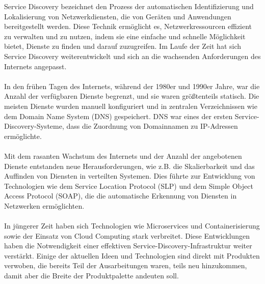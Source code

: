 \documentclass[../vs-script-first-v01.tex]{subfiles}
\begin{document}
Service Discovery bezeichnet den Prozess der automatischen Identifizierung und Lokalisierung von Netzwerkdiensten, die von Geräten und Anwendungen bereitgestellt werden. Diese Technik ermöglicht es, Netzwerkressourcen effizient zu verwalten und zu nutzen, indem sie eine einfache und schnelle Möglichkeit bietet, Dienste zu finden und darauf zuzugreifen. Im Laufe der Zeit hat sich Service Discovery weiterentwickelt und sich an die wachsenden Anforderungen des Internets angepasst.
\\\\
In den frühen Tagen des Internets, während der 1980er und 1990er Jahre, war die Anzahl der verfügbaren Dienste begrenzt, und sie waren größtenteils statisch. Die meisten Dienste wurden manuell konfiguriert und in zentralen Verzeichnissen wie dem Domain Name System (DNS) gespeichert. DNS war eines der ersten Service-Discovery-Systeme, dass die Zuordnung von Domainnamen zu IP-Adressen ermöglichte.
\\\\
Mit dem rasanten Wachstum des Internets und der Anzahl der angebotenen Dienste entstanden neue Herausforderungen, wie z.B. die Skalierbarkeit und das Auffinden von Diensten in verteilten Systemen. Dies führte zur Entwicklung von Technologien wie dem Service Location Protocol (SLP) und dem Simple Object Access Protocol (SOAP), die die automatische Erkennung von Diensten in Netzwerken ermöglichten.
\\\\
In jüngerer Zeit haben sich Technologien wie Microservices und Containerisierung sowie der Einsatz von Cloud Computing stark verbreitet. Diese Entwicklungen haben die Notwendigkeit einer effektiven Service-Discovery-Infrastruktur weiter verstärkt. Einige der aktuellen Ideen und Technologien sind direkt mit Produkten verwoben, die bereits Teil der Ausarbeitungen waren, teils neu hinzukommen, damit aber die Breite der Produktpalette andeuten soll.
\end{document}
